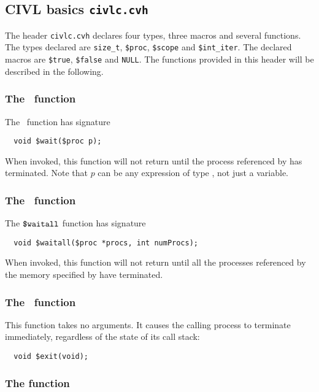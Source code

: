 \subsection{CIVL basics \texttt{civlc.cvh}}
\label{subsec:civlcLibrary}
The header \texttt{civlc.cvh} declares four types, three macros and  several functions. The types declared are \texttt{size\_t}, \texttt{\$proc},
\texttt{\$scope} and \texttt{\$int\_iter}. The declared macros are \texttt{\$true}, \texttt{\$false} and \texttt{NULL}. The functions provided in this header
will be described in the following.

\subsubsection{The \cwait\ function}
\label{subsubsec:wait}
The \cwait\ function has signature
\begin{verbatim}
  void $wait($proc p);
\end{verbatim}

When invoked, this function will not return until the process
referenced by  has terminated. Note that $p$ can be any
expression of type \cproc{}, not just a variable.

\subsubsection{The \cwaitall\ function}
\label{subsubsec:waitall}
The $\mbox{\texttt{\${}waitall}}$ function has signature
\begin{verbatim}
  void $waitall($proc *procs, int numProcs);
\end{verbatim}
When invoked, this function will not return until all the  processes
referenced by the memory specified by  have terminated.

\subsubsection{The \cexit\ function}
\label{subsubsec:exit}
This function takes no arguments.  It causes the
calling process to terminate immediately, regardless of the state of
its call stack:
\begin{verbatim}
  void $exit(void);
\end{verbatim}

\subsubsection{The \cchooseint{} function}
\label{subsubsec:chooseint}

